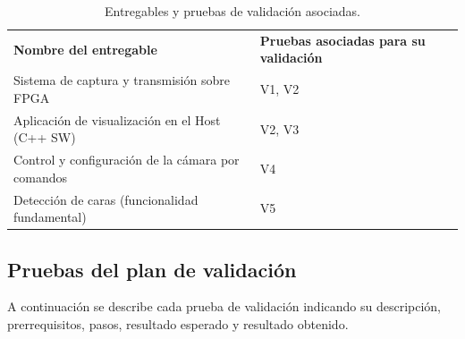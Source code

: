 \documentclass[../main.tex]{subfiles}
\begin{document}
\begin{table}[H]
\centering
\caption{Entregables y pruebas de validación asociadas.}
\label{tab:entregables}
\begin{tabular}{>{\raggedright\arraybackslash}p{8.5cm}>{\raggedright\arraybackslash}p{4.5cm}}
\rowcolor[HTML]{156082}
{\color{white}\textbf{Nombre del entregable}} & {\color{white}\textbf{Pruebas asociadas para su validación}} \\
\rowcolor[HTML]{C0E6F5}
Sistema de captura y transmisión sobre FPGA & V1, V2 \\
Aplicación de visualización en el Host (C++ \ac{SW}) & V2, V3 \\
\rowcolor[HTML]{C0E6F5}
Control y configuración de la cámara por comandos & V4 \\
Detección de caras (funcionalidad fundamental) & V5 \\
\end{tabular}
\end{table}


\subsection{Pruebas del plan de validación}
\label{subsec:pruebas_validacion}
A continuación se describe cada prueba de validación indicando su descripción, prerrequisitos, pasos, resultado esperado y resultado obtenido.
\end{document}

